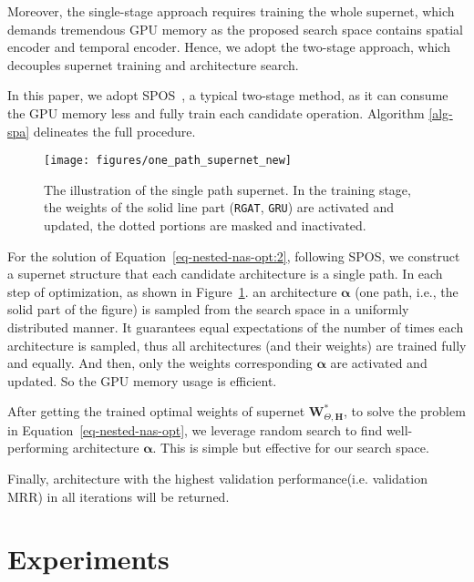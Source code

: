\documentclass[11pt]{article}
\def\bW{\textbf{W}}
\def\bal{\bm{\alpha}}
\begin{document}
Moreover, 
the single-stage approach requires training the whole supernet, 
which demands tremendous GPU memory as the proposed search space contains spatial encoder and temporal encoder. 
Hence,
we adopt the two-stage approach,
which decouples supernet training and architecture search.
 
In this paper, 
we adopt SPOS~\citep{guo2020single},
a typical two-stage method,
as it can consume the GPU memory less and fully train each candidate operation.
Algorithm \ref{alg-spa} delineates the full procedure. 

\begin{figure}[t]
	\centering
	\texttt{[image: figures/one\_path\_supernet\_new]}
	\caption{The illustration of the single path supernet.
		In the training stage, 
		the weights of the solid line part (\texttt{RGAT}, \texttt{GRU}) are activated and updated, the dotted portions are masked and inactivated.}
	\label{fig-search_algorithm}
	\vspace{-10px}
\end{figure}

 For the solution of Equation~\eqref{eq-nested-nas-opt:2}, 
following SPOS,
we construct a supernet structure 
that each candidate architecture is a single path.
In each step of optimization, 
as shown in Figure~\ref{fig-search_algorithm}.
an architecture $\bal$ (one path, i.e., the solid part of the figure) is sampled from the search space 
in a uniformly distributed manner.
It guarantees equal expectations of the number of times each architecture is sampled, 
thus all architectures (and their weights) are trained fully and equally.
And then, 
only the weights corresponding $\bal$ are activated and updated.
So the GPU memory usage is efficient. 

 After getting the trained optimal weights of supernet $\bW_{\Theta,\mathbf{H}}^*$, 
to solve the problem in Equation~\eqref{eq-nested-nas-opt}, 
we leverage random search to find well-performing architecture $\bal$. 
This is simple but effective for our search space. 

Finally, 
architecture with the highest validation performance(i.e. validation MRR) in all iterations will be returned. 

\section{Experiments}
\end{document}
